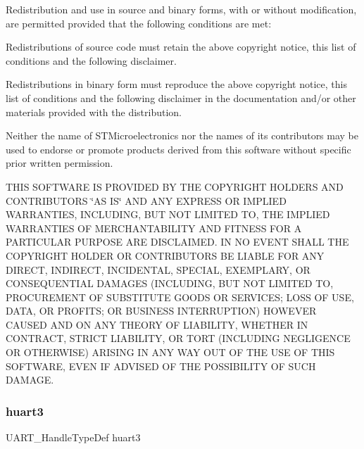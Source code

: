 Redistribution and use in source and binary forms, with or without modification, are permitted provided that the following conditions are met\+:
\begin{DoxyEnumerate}
\item Redistributions of source code must retain the above copyright notice, this list of conditions and the following disclaimer.
\item Redistributions in binary form must reproduce the above copyright notice, this list of conditions and the following disclaimer in the documentation and/or other materials provided with the distribution.
\item Neither the name of S\+T\+Microelectronics nor the names of its contributors may be used to endorse or promote products derived from this software without specific prior written permission.
\end{DoxyEnumerate}

T\+H\+IS S\+O\+F\+T\+W\+A\+RE IS P\+R\+O\+V\+I\+D\+ED BY T\+HE C\+O\+P\+Y\+R\+I\+G\+HT H\+O\+L\+D\+E\+RS A\+ND C\+O\+N\+T\+R\+I\+B\+U\+T\+O\+RS \char`\"{}\+A\+S I\+S\char`\"{} A\+ND A\+NY E\+X\+P\+R\+E\+SS OR I\+M\+P\+L\+I\+ED W\+A\+R\+R\+A\+N\+T\+I\+ES, I\+N\+C\+L\+U\+D\+I\+NG, B\+UT N\+OT L\+I\+M\+I\+T\+ED TO, T\+HE I\+M\+P\+L\+I\+ED W\+A\+R\+R\+A\+N\+T\+I\+ES OF M\+E\+R\+C\+H\+A\+N\+T\+A\+B\+I\+L\+I\+TY A\+ND F\+I\+T\+N\+E\+SS F\+OR A P\+A\+R\+T\+I\+C\+U\+L\+AR P\+U\+R\+P\+O\+SE A\+RE D\+I\+S\+C\+L\+A\+I\+M\+ED. IN NO E\+V\+E\+NT S\+H\+A\+LL T\+HE C\+O\+P\+Y\+R\+I\+G\+HT H\+O\+L\+D\+ER OR C\+O\+N\+T\+R\+I\+B\+U\+T\+O\+RS BE L\+I\+A\+B\+LE F\+OR A\+NY D\+I\+R\+E\+CT, I\+N\+D\+I\+R\+E\+CT, I\+N\+C\+I\+D\+E\+N\+T\+AL, S\+P\+E\+C\+I\+AL, E\+X\+E\+M\+P\+L\+A\+RY, OR C\+O\+N\+S\+E\+Q\+U\+E\+N\+T\+I\+AL D\+A\+M\+A\+G\+ES (I\+N\+C\+L\+U\+D\+I\+NG, B\+UT N\+OT L\+I\+M\+I\+T\+ED TO, P\+R\+O\+C\+U\+R\+E\+M\+E\+NT OF S\+U\+B\+S\+T\+I\+T\+U\+TE G\+O\+O\+DS OR S\+E\+R\+V\+I\+C\+ES; L\+O\+SS OF U\+SE, D\+A\+TA, OR P\+R\+O\+F\+I\+TS; OR B\+U\+S\+I\+N\+E\+SS I\+N\+T\+E\+R\+R\+U\+P\+T\+I\+ON) H\+O\+W\+E\+V\+ER C\+A\+U\+S\+ED A\+ND ON A\+NY T\+H\+E\+O\+RY OF L\+I\+A\+B\+I\+L\+I\+TY, W\+H\+E\+T\+H\+ER IN C\+O\+N\+T\+R\+A\+CT, S\+T\+R\+I\+CT L\+I\+A\+B\+I\+L\+I\+TY, OR T\+O\+RT (I\+N\+C\+L\+U\+D\+I\+NG N\+E\+G\+L\+I\+G\+E\+N\+CE OR O\+T\+H\+E\+R\+W\+I\+SE) A\+R\+I\+S\+I\+NG IN A\+NY W\+AY O\+UT OF T\+HE U\+SE OF T\+H\+IS S\+O\+F\+T\+W\+A\+RE, E\+V\+EN IF A\+D\+V\+I\+S\+ED OF T\+HE P\+O\+S\+S\+I\+B\+I\+L\+I\+TY OF S\+U\+CH D\+A\+M\+A\+GE. \mbox{\label{stm32f3xx__it_8c_ab7c63c1b0f65db92b6a4ea19edf957e1}} 
\subsubsection{huart3}
{\footnotesize\ttfamily U\+A\+R\+T\+\_\+\+Handle\+Type\+Def huart3}

